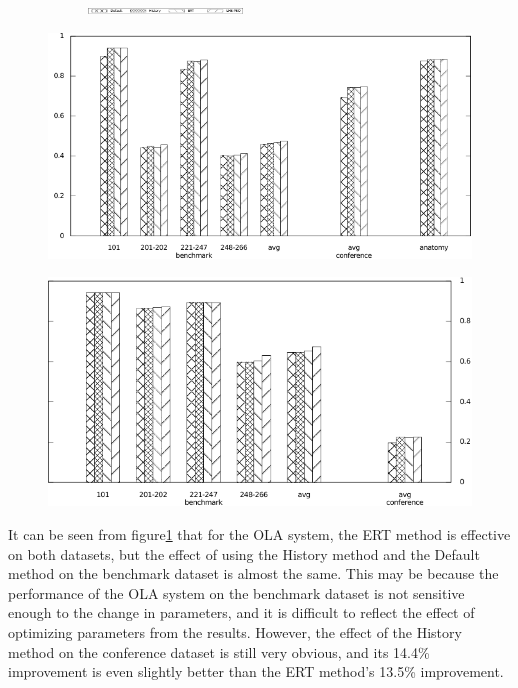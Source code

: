 \documentclass[twoside]{article}
\begin{document}
\begin{figure}[htb!]\centering
\begin{subfigure}{\textwidth}
	\centering
	\includegraphics[width=0.45\textwidth]{figures/legend.pdf}
\end{subfigure}
\begin{minipage}{0.49\textwidth}
	\centering
	\includegraphics[width=\textwidth]{data_figs/LogMap_F1-Measure.pdf}
	\label{fig:LogMap_F1-Measure}
\end{minipage}
\begin{minipage}{0.49\textwidth}
	\centering
	\includegraphics[width=\textwidth]{data_figs/OLA_F1-Measure.pdf}
	\label{fig:OLA_F1-Measure}
\end{minipage}
\end{figure}

It can be seen from figure\ref{fig:OLA_F1-Measure} that for the OLA system, the ERT method is effective on both datasets, but the effect of using the History method and the Default method on the benchmark dataset is almost the same.
This may be because the performance of the OLA system on the benchmark dataset is not sensitive enough to the change in parameters, and it is difficult to reflect the effect of optimizing parameters from the results.
However, the effect of the History method on the conference dataset is still very obvious, and its 14.4\% improvement is even slightly better than the ERT method's 13.5\% improvement.
\end{document}
